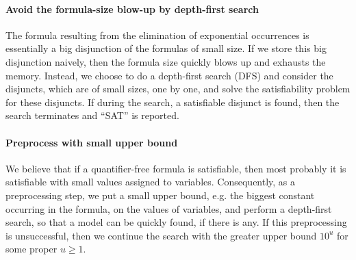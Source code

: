 \paragraph{Avoid the formula-size blow-up by depth-first search}

The {\pa} formula resulting from the elimination of exponential occurrences is essentially a big disjunction of the formulas of small size. If we store this big disjunction naively, then the formula size quickly blows up and exhausts the memory. Instead, we choose to do a depth-first search (DFS) and consider the disjuncts, which are of small sizes, one by one, and solve the satisfiability problem for these disjuncts. If during the search, a satisfiable disjunct is found, then the search terminates and ``SAT'' is reported.

\paragraph{Preprocess with small upper bound}

We believe that if a quantifier-free {\paexp} formula is satisfiable, then most probably it is satisfiable with small values assigned to variables. Consequently, as a preprocessing step, we put a small upper bound, e.g. the biggest constant occurring in the formula, on the values of variables, and perform a depth-first search, so that a model can be quickly found, if there is any. If this preprocessing is unsuccessful, then we continue the search with the greater upper bound $10^u$ for some proper $u \ge 1$.




